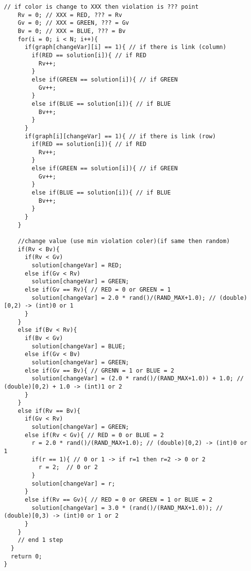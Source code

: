 \documentclass[a4j]{jarticle}
\begin{document}
\begin{lstlisting}[caption=HC.c, label=HC.c, xleftmargin=1cm]
    // if color is change to XXX then violation is ??? point
    Rv = 0; // XXX = RED, ??? = Rv
    Gv = 0; // XXX = GREEN, ??? = Gv
    Bv = 0; // XXX = BLUE, ??? = Bv
    for(i = 0; i < N; i++){
      if(graph[changeVar][i] == 1){ // if there is link (column)
        if(RED == solution[i]){ // if RED
          Rv++;
        }
        else if(GREEN == solution[i]){ // if GREEN
          Gv++;
        }
        else if(BLUE == solution[i]){ // if BLUE
          Bv++;
        }
      }
      if(graph[i][changeVar] == 1){ // if there is link (row)
        if(RED == solution[i]){ // if RED
          Rv++;
        }
        else if(GREEN == solution[i]){ // if GREEN
          Gv++;
        }
        else if(BLUE == solution[i]){ // if BLUE
          Bv++;
        }
      }
    }
    
    //change value (use min violation coler)(if same then random)
    if(Rv < Bv){
      if(Rv < Gv)
        solution[changeVar] = RED;
      else if(Gv < Rv)
        solution[changeVar] = GREEN;
      else if(Gv == Rv){ // RED = 0 or GREEN = 1
        solution[changeVar] = 2.0 * rand()/(RAND_MAX+1.0); // (double)[0,2) -> (int)0 or 1
      }
    }
    else if(Bv < Rv){
      if(Bv < Gv)
        solution[changeVar] = BLUE;
      else if(Gv < Bv)
        solution[changeVar] = GREEN;
      else if(Gv == Bv){ // GRENN = 1 or BLUE = 2
        solution[changeVar] = (2.0 * rand()/(RAND_MAX+1.0)) + 1.0; // (double)[0,2) + 1.0 -> (int)1 or 2
      }
    }
    else if(Rv == Bv){
      if(Gv < Rv)
        solution[changeVar] = GREEN;
      else if(Rv < Gv){ // RED = 0 or BLUE = 2
        r = 2.0 * rand()/(RAND_MAX+1.0); // (double)[0,2) -> (int)0 or 1
        if(r == 1){ // 0 or 1 -> if r=1 then r=2 -> 0 or 2
          r = 2;  // 0 or 2
        }
        solution[changeVar] = r;
      }
      else if(Rv == Gv){ // RED = 0 or GREEN = 1 or BLUE = 2
        solution[changeVar] = 3.0 * (rand()/(RAND_MAX+1.0)); // (double)[0,3) -> (int)0 or 1 or 2
      }
    }
    // end 1 step
  }
  return 0;
}
\end{lstlisting}
\end{document}
